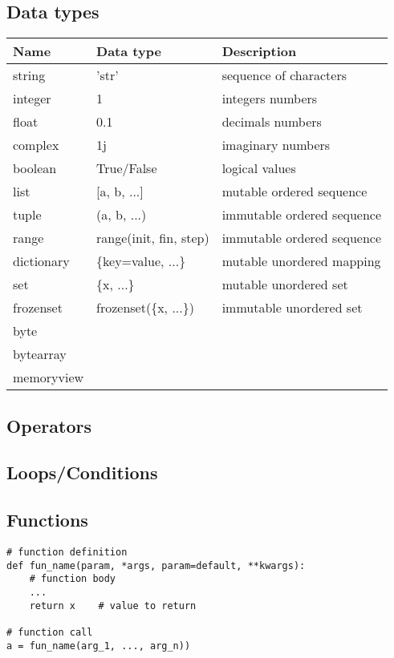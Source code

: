 \subsection{Data types}

\begin{tabularx}{\linewidth}{@{}| l | l | X |@{}}
    \hline
    Name & Data type & Description \\
    \hline
    string & 'str' & sequence of characters \\ 
    integer & 1 & integers numbers \\
    float & 0.1 & decimals numbers \\
    complex & 1j & imaginary numbers \\
    boolean & True/False & logical values \\
    list & [a, b, ...] & mutable ordered sequence \\
    tuple & (a, b, ...) & immutable ordered sequence \\
    range & range(init, fin, step) & immutable ordered sequence \\
    dictionary & \{key=value, ...\} & mutable unordered mapping \\
    set & \{x, ...\} &  mutable unordered set \\
    frozenset & frozenset(\{x, ...\}) & immutable unordered set \\
    byte & & \\
    bytearray & & \\
    memoryview & & \\
    \hline
\end{tabularx}




\subsection{Operators}




\subsection{Loops/Conditions}





\subsection{Functions}

\begin{verbatim}
# function definition
def fun_name(param, *args, param=default, **kwargs):
    # function body
    ...
    return x    # value to return

# function call
a = fun_name(arg_1, ..., arg_n))
\end{verbatim}






